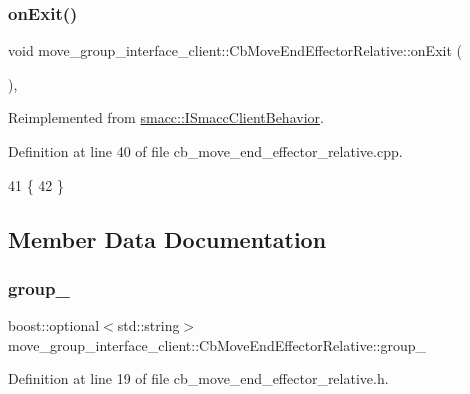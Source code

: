 \subsubsection{\texorpdfstring{on\+Exit()}{onExit()}}
{\footnotesize\ttfamily void move\+\_\+group\+\_\+interface\+\_\+client\+::\+Cb\+Move\+End\+Effector\+Relative\+::on\+Exit (\begin{DoxyParamCaption}{ }\end{DoxyParamCaption})\hspace{0.3cm}{\ttfamily [override]}, {\ttfamily [virtual]}}



Reimplemented from \hyperlink{classsmacc_1_1ISmaccClientBehavior_a36bf771905e3bf750909a15e4215a9b3}{smacc\+::\+I\+Smacc\+Client\+Behavior}.



Definition at line 40 of file cb\+\_\+move\+\_\+end\+\_\+effector\+\_\+relative.\+cpp.


\begin{DoxyCode}
41     \{
42     \}
\end{DoxyCode}


\subsection{Member Data Documentation}
\mbox{\label{classmove__group__interface__client_1_1CbMoveEndEffectorRelative_a3165754a85fd7046e470a399f24d9fb6}} 
\subsubsection{\texorpdfstring{group\+\_\+}{group\_}}
{\footnotesize\ttfamily boost\+::optional$<$std\+::string$>$ move\+\_\+group\+\_\+interface\+\_\+client\+::\+Cb\+Move\+End\+Effector\+Relative\+::group\+\_\+}



Definition at line 19 of file cb\+\_\+move\+\_\+end\+\_\+effector\+\_\+relative.\+h.



